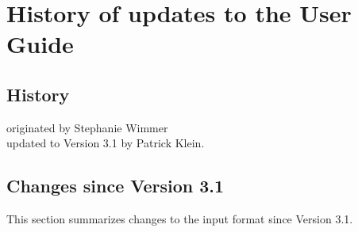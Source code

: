 
\section{History of updates to the \tahoe User Guide}

\subsection{History}
originated by Stephanie Wimmer\\
updated to Version 3.1 by Patrick Klein.

\subsection{Changes since Version 3.1}
\label{sect.changes.log}
This section summarizes changes to the \tahoe input format
since Version 3.1.
